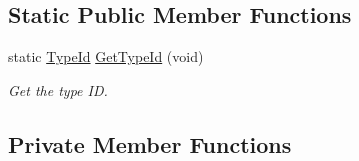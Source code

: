 \subsection*{Static Public Member Functions}
\begin{DoxyCompactItemize}
\item 
static \hyperlink{classns3_1_1TypeId}{Type\+Id} \hyperlink{classns3_1_1SimpleOfdmWimaxPhy_a0c5b73edf9b3c13a0d6e0b80524561e8}{Get\+Type\+Id} (void)
\begin{DoxyCompactList}\small\item\em Get the type ID. \end{DoxyCompactList}\end{DoxyCompactItemize}
\subsection*{Private Member Functions}
